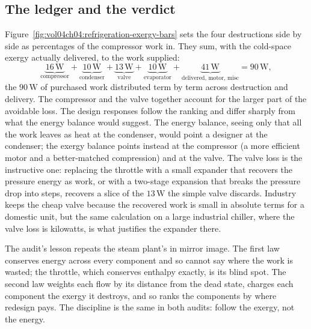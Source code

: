 \subsection{The ledger and the verdict}

Figure~\ref{fig:vol04ch04:refrigeration-exergy-bars} sets the four
destructions side by side as percentages of the compressor work in. They
sum, with the cold-space exergy actually delivered, to the work supplied:
\[
\underbrace{16\,\text{W}}_{\text{compressor}} +
\underbrace{10\,\text{W}}_{\text{condenser}} +
\underbrace{13\,\text{W}}_{\text{valve}} +
\underbrace{10\,\text{W}}_{\text{evaporator}} +
\underbrace{41\,\text{W}}_{\text{delivered, motor, misc}}
= 90\,\text{W},
\]
the $90\,\text{W}$ of purchased work distributed term by term across
destruction and delivery. The compressor and the valve together account
for the larger part of the avoidable loss. The design responses follow
the ranking and differ sharply from what the energy balance would
suggest. The energy balance, seeing only that all the work leaves as heat
at the condenser, would point a designer at the condenser; the exergy
balance points instead at the compressor (a more efficient motor and a
better-matched compression) and at the valve. The valve loss is the
instructive one: replacing the throttle with a small expander that
recovers the pressure energy as work, or with a two-stage expansion that
breaks the pressure drop into steps, recovers a slice of the
$13\,\text{W}$ the simple valve discards. Industry keeps the cheap valve
because the recovered work is small in absolute terms for a domestic
unit, but the same calculation on a large industrial chiller, where the
valve loss is kilowatts, is what justifies the expander there.

The audit's lesson repeats the steam plant's in mirror image. The first
law conserves energy across every component and so cannot say where the
work is wasted; the throttle, which conserves enthalpy exactly, is its
blind spot. The second law weights each flow by its distance from the
dead state, charges each component the exergy it destroys, and so ranks
the components by where redesign pays. The discipline is the same in both
audits: follow the exergy, not the energy.





